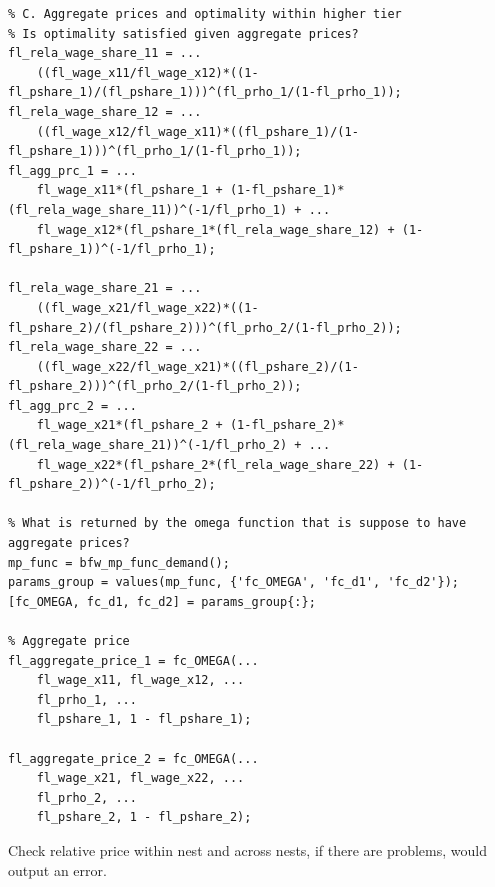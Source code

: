\documentclass[
]{book}
\begin{document}
\begin{verbatim}
% C. Aggregate prices and optimality within higher tier
% Is optimality satisfied given aggregate prices?
fl_rela_wage_share_11 = ...
    ((fl_wage_x11/fl_wage_x12)*((1-fl_pshare_1)/(fl_pshare_1)))^(fl_prho_1/(1-fl_prho_1));
fl_rela_wage_share_12 = ...
    ((fl_wage_x12/fl_wage_x11)*((fl_pshare_1)/(1-fl_pshare_1)))^(fl_prho_1/(1-fl_prho_1));
fl_agg_prc_1 = ...
    fl_wage_x11*(fl_pshare_1 + (1-fl_pshare_1)*(fl_rela_wage_share_11))^(-1/fl_prho_1) + ...
    fl_wage_x12*(fl_pshare_1*(fl_rela_wage_share_12) + (1-fl_pshare_1))^(-1/fl_prho_1);

fl_rela_wage_share_21 = ...
    ((fl_wage_x21/fl_wage_x22)*((1-fl_pshare_2)/(fl_pshare_2)))^(fl_prho_2/(1-fl_prho_2));
fl_rela_wage_share_22 = ...
    ((fl_wage_x22/fl_wage_x21)*((fl_pshare_2)/(1-fl_pshare_2)))^(fl_prho_2/(1-fl_prho_2));
fl_agg_prc_2 = ...
    fl_wage_x21*(fl_pshare_2 + (1-fl_pshare_2)*(fl_rela_wage_share_21))^(-1/fl_prho_2) + ...
    fl_wage_x22*(fl_pshare_2*(fl_rela_wage_share_22) + (1-fl_pshare_2))^(-1/fl_prho_2);

% What is returned by the omega function that is suppose to have aggregate prices?
mp_func = bfw_mp_func_demand();
params_group = values(mp_func, {'fc_OMEGA', 'fc_d1', 'fc_d2'});
[fc_OMEGA, fc_d1, fc_d2] = params_group{:};

% Aggregate price
fl_aggregate_price_1 = fc_OMEGA(...
    fl_wage_x11, fl_wage_x12, ...
    fl_prho_1, ...
    fl_pshare_1, 1 - fl_pshare_1);

fl_aggregate_price_2 = fc_OMEGA(...
    fl_wage_x21, fl_wage_x22, ...
    fl_prho_2, ...
    fl_pshare_2, 1 - fl_pshare_2);    
\end{verbatim}

Check relative price within nest and across nests, if there are
problems, would output an error.
\end{document}
